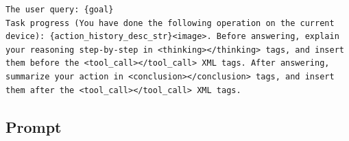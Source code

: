 \begin{tcolorbox}[
  promptstyle,
  title=\texttt{Prompt for ReAct-Style Qwen3-VL (per-step user prompt).},
]
\begin{Verbatim}[fontsize=\scriptsize,breaklines,breakanywhere]
The user query: {goal}
Task progress (You have done the following operation on the current device): {action_history_desc_str}<image>. Before answering, explain your reasoning step-by-step in <thinking></thinking> tags, and insert them before the <tool_call></tool_call> XML tags. After answering, summarize your action in <conclusion></conclusion> tags, and insert them after the <tool_call></tool_call> XML tags.
\end{Verbatim}
\end{tcolorbox}

\subsection{\ourmethod Prompt}
\label{sec:appendix-conact-prompt}

